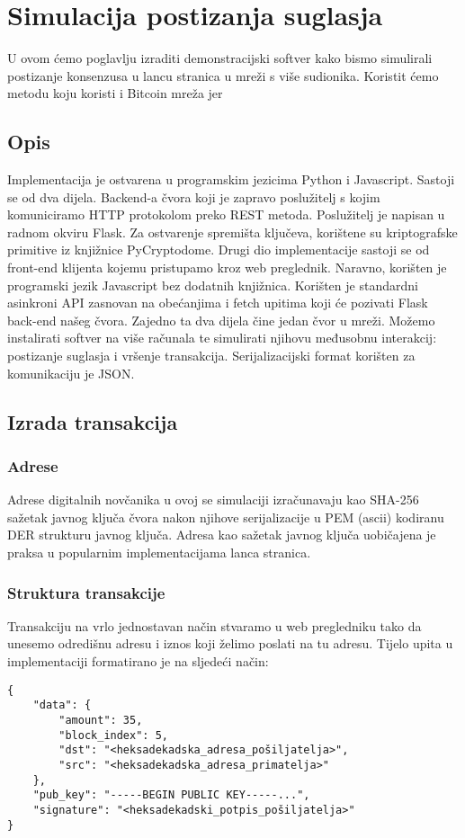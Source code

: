 \documentclass[utf8, zavrsni]{fer}
\begin{document}
\chapter{Simulacija postizanja suglasja}

U ovom ćemo poglavlju izraditi demonstracijski softver kako bismo simulirali postizanje konsenzusa u lancu stranica u mreži s više sudionika. Koristit ćemo metodu koju koristi i Bitcoin mreža jer 

\section{Opis}
Implementacija je ostvarena u programskim jezicima Python i Javascript. Sastoji se od dva dijela. Backend-a čvora koji je zapravo poslužitelj s kojim komuniciramo HTTP protokolom preko REST metoda. Poslužitelj je napisan u radnom okviru Flask. Za ostvarenje spremišta ključeva, korištene su kriptografske primitive iz knjižnice PyCryptodome. Drugi dio implementacije sastoji se od front-end klijenta kojemu pristupamo kroz web preglednik. Naravno, korišten je programski jezik Javascript bez dodatnih knjižnica. Korišten je standardni asinkroni API zasnovan na obećanjima i fetch upitima koji će pozivati Flask back-end našeg čvora. Zajedno ta dva dijela čine jedan čvor u mreži. Možemo instalirati softver na više računala te simulirati njihovu međusobnu interakcij: postizanje suglasja i vršenje transakcija. Serijalizacijski format korišten za komunikaciju je JSON.

\section{Izrada transakcija}

\subsection{Adrese}
Adrese digitalnih novčanika u ovoj se simulaciji izračunavaju kao SHA-256 sažetak javnog ključa čvora nakon njihove serijalizacije u PEM (ascii) kodiranu DER strukturu javnog ključa. Adresa kao sažetak javnog ključa uobičajena je praksa u popularnim implementacijama lanca stranica.

\subsection{Struktura transakcije}
Transakciju na vrlo jednostavan način stvaramo u web pregledniku tako da unesemo odredišnu adresu i iznos koji želimo poslati na tu adresu. Tijelo upita u implementaciji formatirano je na sljedeći način:
\begin{verbatim}
{
	"data": {
		"amount": 35,
		"block_index": 5,
		"dst": "<heksadekadska_adresa_pošiljatelja>",
		"src": "<heksadekadska_adresa_primatelja>"
	},
	"pub_key": "-----BEGIN PUBLIC KEY-----...",
	"signature": "<heksadekadski_potpis_pošiljatelja>"
}
\end{verbatim}
\end{document}

